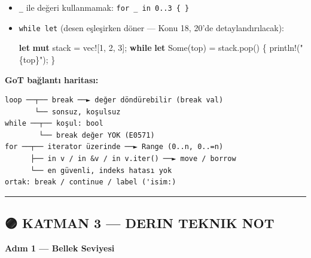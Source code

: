 \documentclass[12pt,a4paper]{article}
\newenvironment{Shaded}{}{}
\newcommand{\ConstantTok}[1]{\textcolor[rgb]{0.53,0.00,0.00}{#1}}
\newcommand{\ControlFlowTok}[1]{\textcolor[rgb]{0.00,0.44,0.13}{\textbf{#1}}}
\newcommand{\DecValTok}[1]{\textcolor[rgb]{0.25,0.63,0.44}{#1}}
\newcommand{\FunctionTok}[1]{\textcolor[rgb]{0.02,0.16,0.49}{#1}}
\newcommand{\KeywordTok}[1]{\textcolor[rgb]{0.00,0.44,0.13}{\textbf{#1}}}
\newcommand{\NormalTok}[1]{#1}
\newcommand{\OperatorTok}[1]{\textcolor[rgb]{0.40,0.40,0.40}{#1}}
\newcommand{\StringTok}[1]{\textcolor[rgb]{0.25,0.44,0.63}{#1}}
\begin{document}
\begin{itemize}
  Hata: \texttt{for} sonrası \texttt{v} kullanılırsa → \texttt{E0382}: borrow of moved value
\item
  \texttt{\_} ile değeri kullanmamak: \texttt{for\ \_\ in\ 0..3\ \{\ \}}
\item
  \texttt{while\ let} (desen eşleşirken döner --- Konu 18, 20'de detaylandırılacak):

\begin{Shaded}
\begin{Highlighting}[]
\KeywordTok{let} \KeywordTok{mut}\NormalTok{ stack }\OperatorTok{=}\NormalTok{ vec}\OperatorTok{![}\DecValTok{1}\OperatorTok{,} \DecValTok{2}\OperatorTok{,} \DecValTok{3}\OperatorTok{];}
\ControlFlowTok{while} \KeywordTok{let} \ConstantTok{Some}\OperatorTok{(}\NormalTok{top}\OperatorTok{)} \OperatorTok{=}\NormalTok{ stack}\OperatorTok{.}\FunctionTok{pop}\OperatorTok{()} \OperatorTok{\{}\NormalTok{ println}\OperatorTok{!(}\StringTok{"\{top\}"}\OperatorTok{);} \OperatorTok{\}}
\end{Highlighting}
\end{Shaded}
\end{itemize}

\textbf{GoT bağlantı haritası:}

\begin{verbatim}
loop ──┬── break ──► değer döndürebilir (break val)
       └── sonsuz, koşulsuz
while ──┬── koşul: bool
        └── break değer YOK (E0571)
for ──┬── iterator üzerinde ──► Range (0..n, 0..=n)
      ├── in v / in &v / in v.iter() ──► move / borrow
      └── en güvenli, indeks hatası yok
ortak: break / continue / label ('isim:)
\end{verbatim}

\begin{center}\rule{0.5\linewidth}{0.5pt}\end{center}

\subsection{🟣 KATMAN 3 --- DERIN TEKNIK NOT}\label{katman-3-—-derin-teknik-not-8}

\textbf{Adım 1 --- Bellek Seviyesi}
\end{document}
